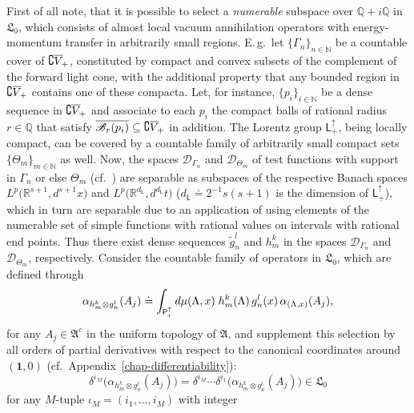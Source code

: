 \documentclass[11pt,twoside,openright]{report}
\theoremstyle{definition}
\theoremstyle{plain}
\theoremstyle{remark}
\theoremstyle{assumption}
\newcommand{\set}[1]{\{ #1 \}}
\newcommand{\Nbb}{\mathbb{N}}
\newcommand{\Qbb}{\mathbb{Q}}
\newcommand{\Rbb}{\mathbb{R}}
\newcommand{\Afrak}{\mathfrak{A}}
\newcommand{\Lfrak}{\mathfrak{L}}
\newcommand{\Dscr}{\mathscr{D}}
\newcommand{\Lsf}{\mathsf{L}}
\newcommand{\unit}{\mathbf{1}}
\newcommand{\Rsone}{\mathbb{R}^{s + 1}}
\newcommand{\Lor}{\mathsf{L}_+^\uparrow}
\newcommand{\Poin}{\mathsf{P}_{\negthinspace +}^\uparrow}
\newcommand{\fwcone}{\overline{V}_{\negthinspace +}}
\newcommand{\aLax}{\alpha_{( \Lambda , x )}}
\newcommand{\Acount}{\mathfrak{A}^c}
\begin{document}
First of all note, that it is possible to select a \emph{numerable}
subspace over $\Qbb + i \Qbb$ in $\Lfrak_0$, which consists of almost
local vacuum annihilation operators with energy-momentum transfer in
arbitrarily small regions. E.\,g.~let $\set{\Gamma_n}_{n \in \Nbb}$ be
a countable cover of $\complement \fwcone$, constituted by compact and
convex subsets of the complement of the forward light cone, with the
additional property that any bounded region in $\complement \fwcone$
contains one of these compacta. Let, for instance, $\set{p_i}_{i \in
\Nbb}$ be a dense sequence in $\complement \fwcone$ and associate to
each $p_i$ the compact balls of rational radius $r \in \Qbb$ that
satisfy $\overline{\mathscr{B}_r ( p_i )} \subseteq \complement
\fwcone$ in addition. The Lorentz group $\Lor$, being locally compact,
can be covered by a countable family of arbitrarily small compact sets
$\set{\Theta_m}_{m \in \Nbb}$ as well. Now, the spaces
$\Dscr_{\Gamma_n}$ and $\Dscr_{\Theta_m}$ of test functions with
support in $\Gamma_n$ or else $\Theta_m$
(cf.~\cite[\S\,12]{jantscher:1971}) are separable as subspaces of the
respective Banach spaces $L^p \bigl( \Rsone , d^{s+1} x \bigr)$ and
$L^p \bigl( \Rbb^{d_\Lsf} , d^{d_\Lsf} t \bigr)$ ($d_\Lsf \doteq
2^{-1} s ( s + 1 )$ is the dimension of $\Lor$), which in turn are
separable due to an application of
\cite[Theorem~IV.(13.20)]{hewitt/stromberg:1969} using elements of the
numerable set of simple functions with rational values on intervals
with rational end points. Thus there exist dense sequences
$\tilde{g}_n^l$ and $h_m^k$ in the spaces $\Dscr_{\Gamma_n}$ and
$\Dscr_{\Theta_m}$, respectively. Consider the countable family of
operators in $\Lfrak_0$, which are defined through
\begin{equation}
  \label{eq-countable-vacann}
  \alpha_{h_m^k \otimes g_n^l} ( A_j ) \doteq \int_{\Poin} d \mu (
  \Lambda , x ) \; h_m^k ( \Lambda ) \, g_n^l ( x ) \, \aLax ( A_j )
  \text{,}
\end{equation}
for any $A_j \in \Acount$ in the uniform topology of $\Afrak$, and
supplement this selection by all orders of partial derivatives with
respect to the canonical coordinates around $( \unit , 0 )$
(cf.~Appendix~\ref{chap-differentiability}):
\begin{equation*}
  \delta^{\iota_M} \bigl( \alpha_{h_m^k \otimes g_n^l} ( A_j ) \bigr)
  = \delta^{i_M} \dotsb \delta^{i_1} \bigl( \alpha_{h_m^k \otimes
  g_n^l} ( A_j ) \bigr) \in \Lfrak_0 
\end{equation*}
for any $M$-tuple $\iota_M = ( i_1 , \dots , i_M )$ with integer
\end{document}
